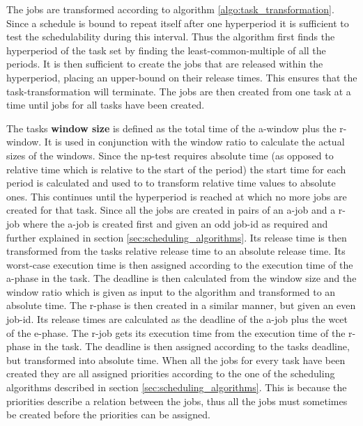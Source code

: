 \documentclass{kththesis}
\begin{document}
The jobs are transformed according to algorithm \ref{algo:task_transformation}. Since a schedule is
bound to repeat itself after one hyperperiod it is sufficient to test the schedulability during this
interval. Thus the algorithm first finds the hyperperiod of the task set by finding the
least-common-multiple of all the periods. It is then sufficient to create the jobs that are released
within the hyperperiod, placing an upper-bound on their release times. This ensures that the
task-transformation will terminate. The jobs are then created from one task at a time until jobs for
all tasks have been created. 

The tasks \textbf{window size} is defined as the total time of the \acrshort{a}-window plus the
\acrshort{r}-window. It is used in conjunction with the window ratio to calculate the actual sizes
of the windows. Since the \acrshort{np}-test requires absolute time (as opposed to relative time
which is relative to the start of the period) the start time for each period is calculated and used
to to transform relative time values to absolute ones. This continues until the hyperperiod is
reached at which no more jobs are created for that task. Since all the jobs are created in pairs of
an \acrshort{a}-job and a \acrshort{r}-job where the \acrshort{a}-job is created first and given an odd
job-id as required and further explained in section \ref{sec:scheduling_algorithms}. Its release
time is then transformed from the tasks relative release time to an absolute release time. Its
worst-case execution time is then assigned according to the execution time of the \acrshort{a}-phase
in the task. The deadline is then calculated from the window size and the window ratio which is
given as input to the algorithm and transformed to an absolute time. The \acrshort{r}-phase is then
created in a similar manner, but given an even job-id. Its release times are calculated as the
deadline of the \acrshort{a}-job plus the \acrshort{wcet} of the \acrshort{e}-phase. The
\acrshort{r}-job gets its execution time from the execution time of the \acrshort{r}-phase in the
task. The deadline is then assigned according to the tasks deadline, but transformed into absolute
time. When all the jobs for every task have been created they are all assigned priorities according
to the one of the scheduling algorithms described in section \ref{sec:scheduling_algorithms}. This
is because the priorities describe a relation between the jobs, thus all the jobs must sometimes be
created before the priorities can be assigned. 
\end{document}
